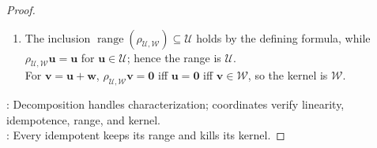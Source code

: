 \begin{proposition}
\begin{proof}
\begin{enumerate}[label=(\roman*)]
For $a,b\in\mathbb{F}$, $R(a\mathbf{v}_1+b\mathbf{v}_2)=a\mathbf{u}_1+b\mathbf{u}_2=aR\mathbf{v}_1+bR\mathbf{v}_2$ by uniqueness of direct-sum decompositions, so $R$ is linear.\\
Also $R^2(\mathbf{u}+\mathbf{w})=R\mathbf{u}=\mathbf{u}=R(\mathbf{u}+\mathbf{w})$, so $R$ is idempotent.
\item[$(iii)$] The inclusion $\operatorname{range}(\rho_{\mathcal{U},\mathcal{W}})\subseteq\mathcal{U}$ holds by the defining formula, while $\rho_{\mathcal{U},\mathcal{W}}\mathbf{u}=\mathbf{u}$ for $\mathbf{u}\in\mathcal{U}$; hence the range is $\mathcal{U}$.\\
For $\mathbf{v}=\mathbf{u}+\mathbf{w}$, $\rho_{\mathcal{U},\mathcal{W}}\mathbf{v}=\mathbf{0}$ iff $\mathbf{u}=\mathbf{0}$ iff $\mathbf{v}\in\mathcal{W}$, so the kernel is $\mathcal{W}$.
\end{enumerate}
: Decomposition handles characterization; coordinates verify linearity, idempotence, range, and kernel.\\
: Every idempotent keeps its range and kills its kernel.
\end{proof}
\end{proposition}

